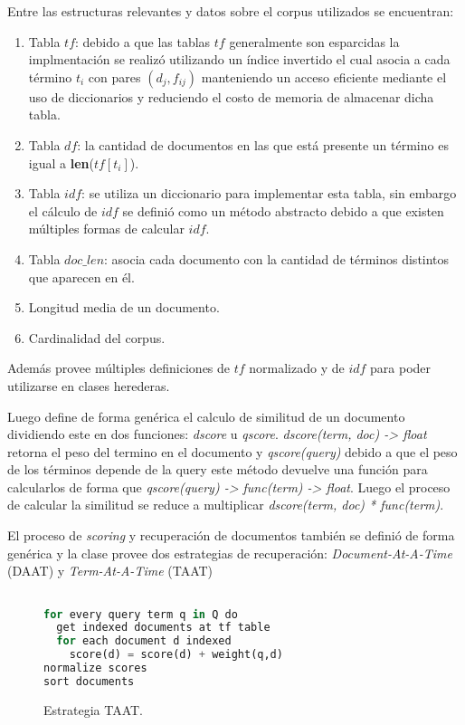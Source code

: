 \documentclass[a4paper,10pt,twocolumn]{article}
\begin{document}
    Entre las estructuras relevantes y datos sobre el corpus utilizados se encuentran:
	\begin{enumerate}
		\item Tabla $tf$: debido a que las tablas $tf$ generalmente son esparcidas la implmentaci\'on se 
		realiz\'o utilizando un \'indice invertido el cual asocia a cada t\'ermino $t_i$ con 
		pares $(d_j, f_{ij})$ manteniendo un acceso eficiente mediante el uso de diccionarios y reduciendo el costo
		de memoria de almacenar dicha tabla.
		\item Tabla $df$: la cantidad de documentos en las que est\'a presente
		un t\'ermino es igual a \textbf{len}($tf[t_i]$).
		\item Tabla $idf$: se utiliza un diccionario para implementar esta tabla, sin embargo el c\'alculo de $idf$ se defini\'o como un
		m\'etodo abstracto debido a que existen m\'ultiples formas de calcular $idf$.
		\item Tabla $doc\_len$: asocia cada documento con la cantidad de t\'erminos distintos que aparecen en \'el.
        \item Longitud media de un documento.
		\item Cardinalidad del corpus.
	\end{enumerate}

    Adem\'as provee m\'ultiples definiciones de $tf$ normalizado y de $idf$ para poder utilizarse en clases herederas.

    Luego define de forma gen\'erica el calculo de similitud de un documento dividiendo este en dos funciones: \textit{dscore} u \textit{qscore}.
    \textit{dscore(term, doc) -> float} retorna el peso del termino en el documento y \textit{qscore(query)} debido a que el peso de los t\'erminos depende
    de la query este m\'etodo devuelve una funci\'on para calcularlos de forma que \textit{qscore(query) -> func(term) -> float}. Luego el proceso de
    calcular la similitud se reduce a multiplicar \textit{dscore(term, doc) * func(term)}.

    El proceso de \textit{scoring} y recuperaci\'on de documentos tambi\'en se defini\'o de forma gen\'erica y la clase provee dos
    estrategias de recuperaci\'on: \textit{Document-At-A-Time} (DAAT) y \textit{Term-At-A-Time} (TAAT)


	\begin{figure}[htb]%
		\begin{lstlisting}[language=python]%

for every query term q in Q do
  get indexed documents at tf table
  for each document d indexed
    score(d) = score(d) + weight(q,d)
normalize scores
sort documents
		\end{lstlisting}
	\caption{Estrategia TAAT.\label{fig:code}}
	\end{figure}
\end{document}
